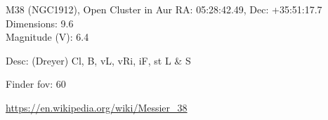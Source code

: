 \begin{block}{M38 (NGC1912), Open Cluster in Aur}
    RA: 05:28:42.49, Dec: +35:51:17.7 \\ 
    Dimensions: 9.6 \\ 
    Magnitude (V): 6.4


    Desc: (Dreyer) Cl, B, vL, vRi, iF, st L \& S 

    Finder fov: 60 

    \url{https://en.wikipedia.org/wiki/Messier_38} 
\end{block}